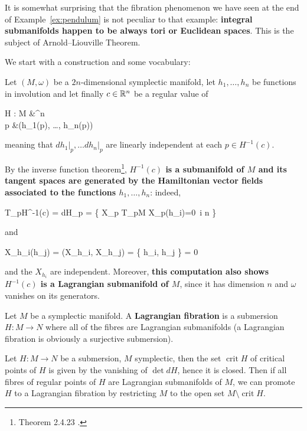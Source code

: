 \documentclass[main.tex]{subfiles}
\begin{document}
It is somewhat surprising that the fibration phenomenon we have seen at the end of Example~\ref{ex:pendulum} is not peculiar to that example: \textbf{integral submanifolds happen to be always tori or Euclidean spaces}. This is the subject of Arnold--Liouville Theorem.

We start with a construction and some vocabulary:

\begin{construction}
\label{const:level_submanifolds_of_involutions}
	Let $(M, \omega)$ be a $2n$-dimensional symplectic manifold, let $h_1, \ldots, h_n$ be functions in involution and let finally $c \in \mathbb{R}^n$ be a regular value of
	\begin{eqalign}
		H : M &\longto \R^n\\
		p &\longmapsto (h_1(p), \ldots, h_n(p))
	\end{eqalign}
	meaning that $dh_1\vert_p, \ldots dh_n \vert_p$ are linearly independent at each $p \in H^{-1}(c)$.

	By the inverse function theorem\footnote{Theorem 2.4.23 \cite{abate2011geometria}.}, \textbf{$H^{-1}(c)$ is a submanifold of $M$ and its tangent spaces are generated by the Hamiltonian vector fields associated to the functions $h_1, \ldots, h_n$}: indeed,
	\begin{eqalign}
		T_pH^{-1}(c) = \ker dH_p = \{ X_p \in T_pM \suchthat X_p(h_i)=0\ \forall i \leq n \}
	\end{eqalign}
	and
	\begin{eqalign}
		X_{h_i}(h_j) = \omega(X_{h_i}, X_{h_j}) = \{ h_i, h_j \} = 0
	\end{eqalign}
	and the $X_{h_i}$ are independent. Moreover, \textbf{this computation also shows $H^{-1}(c)$ is a Lagrangian submanifold of $M$}, since it has dimension $n$ and $\omega$ vanishes on its generators.
\end{construction}

\begin{definition}
	Let $M$ be a symplectic manifold. A \textbf{Lagrangian fibration} is a submersion\footnotemark $H : M \to N$ where all of the fibres are Lagrangian submanifolds (a Lagrangian fibration is obviously a surjective submersion).
\end{definition}

\begin{remark}
\label{rem:submersion_to_Lag_fibration} 
	Let $H : M \to N$ be a submersion, $M$ symplectic, then the set $\operatorname{crit} H$ of critical points of $H$ is given by the vanishing of $\det dH$, hence it is closed. Then if all fibres of regular points of $H$ are Lagrangian submanifolds of $M$, we can promote $H$ to a Lagrangian fibration by restricting $M$ to the open set $M \setminus \operatorname{crit} H$.
\end{remark}
\end{document}
